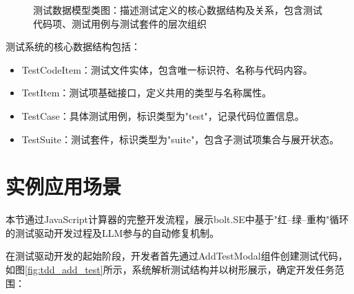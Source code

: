 \begin{figure}[H]
  \centering
  \caption{测试数据模型类图：描述测试定义的核心数据结构及关系，包含测试代码项、测试用例与测试套件的层次组织}
  \label{fig:test_class}
\end{figure}

测试系统的核心数据结构包括：

\begin{itemize}
  \item TestCodeItem：测试文件实体，包含唯一标识符、名称与代码内容。
  
  \item TestItem：测试项基础接口，定义共用的类型与名称属性。
  
  \item TestCase：具体测试用例，标识类型为"test"，记录代码位置信息。
  
  \item TestSuite：测试套件，标识类型为"suite"，包含子测试项集合与展开状态。
\end{itemize}

\section{实例应用场景}
\label{sec:tdd-example}

本节通过JavaScript计算器的完整开发流程，展示bolt.SE中基于"红–绿–重构"循环的测试驱动开发过程及LLM参与的自动修复机制。

在测试驱动开发的起始阶段，开发者首先通过AddTestModal组件创建测试代码，如图\ref{fig:tdd_add_test}所示，系统解析测试结构并以树形展示，确定开发任务范围：

